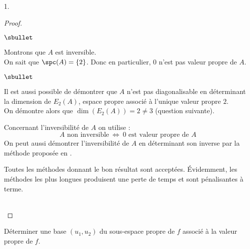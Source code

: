 \begin{noliste}{1.}
\begin{proof}
\begin{noliste}{$\sbullet$}
      \item Montrons que $A$ est inversible.\\
	On sait que $\spc(A) = \{2\}$. Donc en particulier, $0$ n'est
        pas valeur propre de $A$. %
      \end{noliste}
    \begin{remark}%
      \begin{noliste}{$\sbullet$}
      \item Il est aussi possible de démontrer que $A$ n'est pas
        diagonalisable en déterminant la dimension de $E_2(A)$,
        espace propre associé à l'unique valeur propre $2$.\\
        On démontre alors que $\dim(E_2(A)) = 2 \neq 3$ (\cf question
        suivante).
      \item Concernant l'inversibilité de $A$ on utilise :
        \[
        \mbox{$A$ non inversible} \ \Leftrightarrow \ \mbox{$0$ est
          valeur propre de $A$}
        \]
        On peut aussi démontrer l'inversibilité de $A$ en déterminant
        son inverse par la méthode proposée en .
      \item Toutes les méthodes donnant le bon résultat sont
        acceptées. Évidemment, les méthodes les plus longues
        produisent une perte de temps et sont pénalisantes à terme.
      \end{noliste}
    \end{remark}~\\[-1.2cm]
  \end{proof}		

\item Déterminer une base $(u_{1},u_{2})$ du sous-espace propre de $f$
  associé à la valeur propre de $f$.


\end{noliste}
